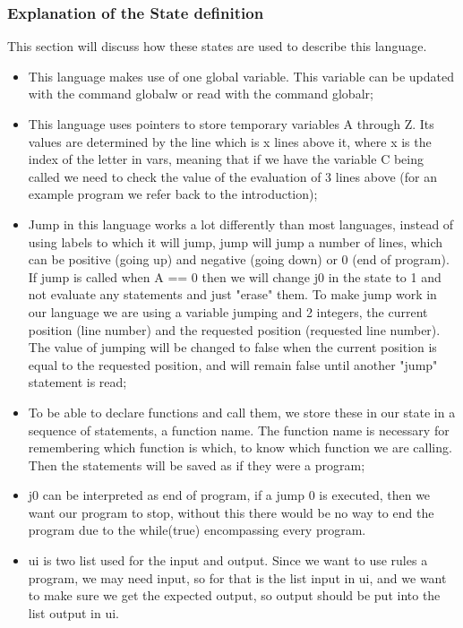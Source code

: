 \documentclass{article}
\begin{document}
\subsubsection{Explanation of the State definition}
This section will discuss how these states are used to describe this language.
\begin{itemize}
    \item This language makes use of one global variable. This variable can be updated with the command globalw or read with the command globalr;
    \item This language uses pointers to store temporary variables A through Z. Its values are determined by the line which is x lines above it, where x is the index of the letter in vars, meaning that if we have the variable C being called we need to check the value of the evaluation of 3 lines above (for an example program we refer back to the introduction);
    \item Jump in this language works a lot differently than most languages, instead of using labels to which it will jump, jump will jump a number of lines, which can be positive (going up) and negative (going down) or 0 (end of program). If jump is called when A == 0 then we will change j0 in the state to 1 and not evaluate any statements and just "erase" them. To make jump work in our language we are using a variable jumping and 2 integers, the current position (line number) and the requested position (requested line number). The value of jumping will be changed to false when the current position is equal to the requested position, and will remain false until another "jump" statement is read;
    \item To be able to declare functions and call them, we store these in our state in a sequence of statements, a function name. The function name is necessary for remembering which function is which, to know which function we are calling. Then the statements will be saved as if they were a program;
    \item j0 can be interpreted as end of program, if a jump 0 is executed, then we want our program to stop, without this there would be no way to end the program due to the while(true) encompassing every program. 
    \item ui is two list used for the input and output. Since we want to use rules a program, we may need input, so for that is the list input in ui, and we want to make sure we get the expected output, so output should be put into the list output in ui.
    
\end{itemize}
\end{document}
